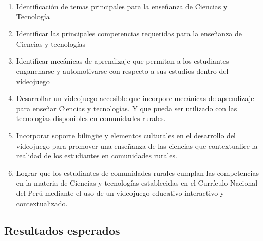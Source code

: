 \begin{enumerate}[label=O\arabic*.,itemsep=5pt]
    \item Identificación de temas principales para la enseñanza de Ciencias y Tecnología
    \item Identificar las principales competencias requeridas para la enseñanza de Ciencias y tecnologías
    \item Identificar mecánicas de aprendizaje que permitan a los estudiantes engancharse y automotivarse con respecto a sus estudios dentro del videojuego
    \item Desarrollar un videojuego accesible que incorpore mecánicas de aprendizaje para enseñar Ciencias y tecnologías. Y que pueda ser utilizado con las tecnologías disponibles en comunidades rurales.
    \item Incorporar soporte bilingüe y elementos culturales en el desarrollo del videojuego para promover una enseñanza de las ciencias que contextualice la realidad de los estudiantes en comunidades rurales.
    \item Lograr que los estudiantes de comunidades rurales cumplan las competencias en la materia de Ciencias y tecnologías establecidas en el Currículo Nacional del Perú mediante el uso de un videojuego educativo interactivo y contextualizado.
\end{enumerate}

\subsection{Resultados esperados}


